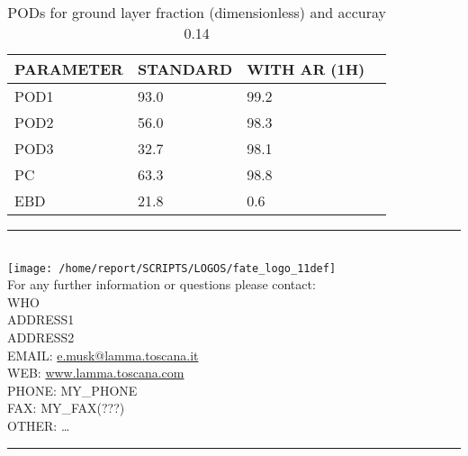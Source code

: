 \documentclass[11pt,english]{article}
\newcommand{\HRule}{\rule{\linewidth}{0.5mm}}
\begin{document}
\begin{table}[]
\begin{center}
\begin{tabular}{|l|l|l|l|}
\hline
\multicolumn{1}{|c|}{\cellcolor[HTML]{C0C0C0}\textbf{PARAMETER}} & \multicolumn{1}{c|}{\cellcolor[HTML]{C0C0C0}\textbf{STANDARD}} & \multicolumn{1}{c|}{\cellcolor[HTML]{C0C0C0}\textbf{WITH AR (1H)}} \\
\hline
\cellcolor[HTML]{C0C0C0}POD1  & 93.0                                & 99.2         \\
\cellcolor[HTML]{C0C0C0}POD2  & 56.0                                & 98.3         \\
\cellcolor[HTML]{C0C0C0}POD3  & 32.7                                & 98.1         \\
\cellcolor[HTML]{C0C0C0}PC    & 63.3                                  & 98.8           \\
\cellcolor[HTML]{C0C0C0}EBD   & 21.8                                 & 0.6          \\
\hline
\end{tabular}
\caption{PODs for ground layer fraction (dimensionless) and accuray 0.14}
\end{center}
\end{table}

\clearpage

\vspace{1.5cm}
\begin{flushleft}
\HRule \\[0.4cm]
{\texttt{[image: /home/report/SCRIPTS/LOGOS/fate\_logo\_11def]}}
\\
\Large{For any further information or questions please contact:
\\ WHO
\\ ADDRESS1
\\ ADDRESS2
\\ EMAIL: \href{mailto:e.musk@lamma.toscana.it}{e.musk@lamma.toscana.it}
\\ WEB: \href{www.lamma.toscana.com}{www.lamma.toscana.com}
\\ PHONE: MY\_PHONE
\\ FAX: MY\_FAX(???)
\\ OTHER: \dots}
\HRule \\[0.4cm]
\end{flushleft}

\end{document}
